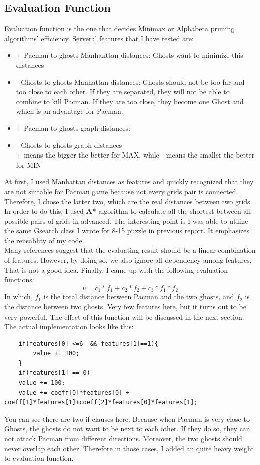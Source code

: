 \documentclass[a4paper, 11pt]{article}
\begin{document}
\subsection{Evaluation Function}
Evaluation function is the one that decides Minimax or Alphabeta pruning algorithms' efficiency. Serveral features that I have tested are:
\begin{itemize}
\item{+} Pacman to ghosts Manhanttan distances: Ghosts want to minimize this distances
\item{-} Ghosts to ghosts Manhattan distances: Ghosts should not be too far and too close to each other. If they are separated, they will not be able to combine to kill Pacman. If they are too close, they become one Ghost and which is an advantage for Pacman.
\item{+} Pacman to ghosts graph distances:
\item{-} Ghosts to ghosts graph distances \\
  + means the bigger the better for MAX, while - means the smaller the better for MIN
\end{itemize}
At first, I used Manhattan distances as features and quickly recognized that they are not suitable for Pacman game because not every grids pair is connected. Therefore, I chose the latter two, which are the real distances between two grids. In order to do this, I used \textbf{A*} algorithm to calculate all the shortest between all possible pairs of grids in advanced. The interesting point is I was able to utilize the same Gsearch class I wrote for 8-15 puzzle in previous report. It emphasizes the reusablity of my code. \\
Many references suggest that the evaluating result should be a linear combination of features. However, by doing so, we also ignore all dependency among features. That is not a good idea. Finally, I came up with the following evaluation functions: 
\[ v = c_1*f_1+c_2*f_2+c_3*f_1*f_2\]
In which, $f_1$ is the total distance between Pacman and the two ghosts, and $f_2$ is the distance between two ghosts. Very few features here, but it turns out to be very powerful. The effect of this function will be discussed in the next section. \\
The actual implementation looks like this:
\begin{lstlisting}
    if(features[0] <=6  && features[1]==1){
     	value += 100;
    }
    if(features[1] == 0)
	value += 100;
    value += coeff[0]*features[0] + coeff[1]*features[1]+coeff[2]*features[0]*features[1];
\end{lstlisting}
You can see there are two if clauses here. Because when Pacman is very close to Ghosts, the ghosts do not want to be next to each other. If they do so, they can not attack Pacman from different directions. Moreover, the two ghosts should never overlap each other. Therefore in those cases, I added an quite heavy weight to evaluation function. 
\end{document}
